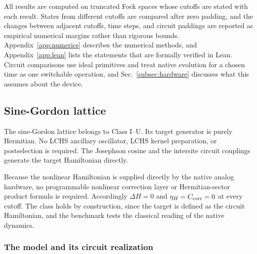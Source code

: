 \documentclass[pra,twocolumn,superscriptaddress,nofootinbib,floatfix]{revtex4-2}
\theoremstyle{remark}
\begin{document}
All results are computed on truncated Fock spaces whose cutoffs are stated with each result. States from different cutoffs are compared after zero padding, and the changes between adjacent cutoffs, time steps, and circuit paddings are reported as empirical numerical margins rather than rigorous bounds. Appendix~\ref{app:numerics} describes the numerical methods, and Appendix~\ref{app:lean} lists the statements that are formally verified in Lean. Circuit comparisons use ideal primitives and treat native evolution for a chosen time as one switchable operation, and Sec.~\ref{subsec:hardware} discusses what this assumes about the device.

\subsection{Sine-Gordon lattice}
\label{sec:sg}

The sine-Gordon lattice belongs to Class I--U. Its target generator is purely Hermitian.
No LCHS ancillary oscillator, LCHS kernel preparation, or postselection is required. The Josephson cosine and the intersite circuit couplings generate the target Hamiltonian directly.

Because the nonlinear Hamiltonian is supplied directly by the native analog hardware, no programmable nonlinear correction layer or Hermitian-sector product formula is required. Accordingly \(\Delta H=0\) and \(\eta_H=C_{\rm corr}=0\) at every cutoff. The class holds by construction, since the target is defined as the circuit Hamiltonian, and the benchmark tests the classical reading of the native dynamics.

\subsubsection{The model and its circuit realization}
\label{subsec:sg-model}
\end{document}
